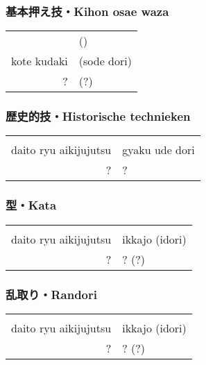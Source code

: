 \subsubsection{基本押え技・Kihon osae waza}
\begin{table}[H]
\begin{center}
\begin{tabular}{rl}
    \ruby{}{}\ruby{}{} & (\ruby{}{})\\
    kote kudaki & (sode dori)\\
    ? & (?)
\end{tabular}
\end{center}
\label{kyuu_4_kihon_osae_waza}
\end{table}

\subsubsection{歴史的技・Historische technieken}
\begin{table}[H]
\begin{center}
\begin{tabular}{rl}
    \ruby{}{}\ruby{}{} & \\
    daito ryu aikijujutsu & gyaku ude dori\\
    ? & ?
\end{tabular}
\end{center}
\label{kyuu_4_historic}
\end{table}

\subsubsection{型・Kata}
\begin{table}[H]
\begin{center}
\begin{tabular}{rl}
    \ruby{}{}\ruby{}{} & \\
    daito ryu aikijujutsu & ikkajo (idori)\\
    ? & ? (?)
\end{tabular}
\end{center}
\label{kyuu_4_kata}
\end{table}

\subsubsection{乱取り・Randori}
\begin{table}[H]
\begin{center}
\begin{tabular}{rl}
    \ruby{}{}\ruby{}{} & \\
    daito ryu aikijujutsu & ikkajo (idori)\\
    ? & ? (?)
\end{tabular}
\end{center}
\label{kyuu_4_randori}
\end{table}
